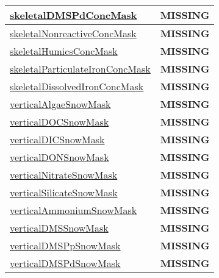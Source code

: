 {\begin{center}
\begin{longtable}{| p{2.0in} | p{4.0in} |}
    \hline
    \hyperref[subsec:var_sec_tracer_masks_skeletalDMSPdConcMask]{skeletalDMSPdConcMask} & {\bf \color{red} MISSING} \\
    \hline
    \hyperref[subsec:var_sec_tracer_masks_skeletalNonreactiveConcMask]{skeletalNonreactiveConcMask} & {\bf \color{red} MISSING} \\
    \hline
    \hyperref[subsec:var_sec_tracer_masks_skeletalHumicsConcMask]{skeletalHumicsConcMask} & {\bf \color{red} MISSING} \\
    \hline
    \hyperref[subsec:var_sec_tracer_masks_skeletalParticulateIronConcMask]{skeletalParticulateIronConcMask} & {\bf \color{red} MISSING} \\
    \hline
    \hyperref[subsec:var_sec_tracer_masks_skeletalDissolvedIronConcMask]{skeletalDissolvedIronConcMask} & {\bf \color{red} MISSING} \\
    \hline
    \hyperref[subsec:var_sec_tracer_masks_verticalAlgaeSnowMask]{verticalAlgaeSnowMask} & {\bf \color{red} MISSING} \\
    \hline
    \hyperref[subsec:var_sec_tracer_masks_verticalDOCSnowMask]{verticalDOCSnowMask} & {\bf \color{red} MISSING} \\
    \hline
    \hyperref[subsec:var_sec_tracer_masks_verticalDICSnowMask]{verticalDICSnowMask} & {\bf \color{red} MISSING} \\
    \hline
    \hyperref[subsec:var_sec_tracer_masks_verticalDONSnowMask]{verticalDONSnowMask} & {\bf \color{red} MISSING} \\
    \hline
    \hyperref[subsec:var_sec_tracer_masks_verticalNitrateSnowMask]{verticalNitrateSnowMask} & {\bf \color{red} MISSING} \\
    \hline
    \hyperref[subsec:var_sec_tracer_masks_verticalSilicateSnowMask]{verticalSilicateSnowMask} & {\bf \color{red} MISSING} \\
    \hline
    \hyperref[subsec:var_sec_tracer_masks_verticalAmmoniumSnowMask]{verticalAmmoniumSnowMask} & {\bf \color{red} MISSING} \\
    \hline
    \hyperref[subsec:var_sec_tracer_masks_verticalDMSSnowMask]{verticalDMSSnowMask} & {\bf \color{red} MISSING} \\
    \hline
    \hyperref[subsec:var_sec_tracer_masks_verticalDMSPpSnowMask]{verticalDMSPpSnowMask} & {\bf \color{red} MISSING} \\
    \hline
    \hyperref[subsec:var_sec_tracer_masks_verticalDMSPdSnowMask]{verticalDMSPdSnowMask} & {\bf \color{red} MISSING} \\

\end{longtable}
\end{center}}
